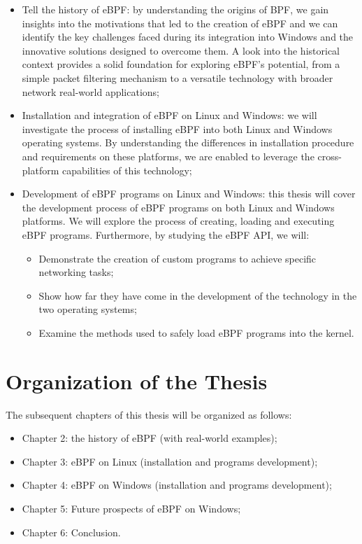\begin{itemize}
	\item Tell the history of eBPF: by understanding the origins of BPF, we gain insights into the 		
		motivations that led to the creation of eBPF and we can identify the key challenges faced during its integration into Windows and the innovative solutions designed to overcome them. 
		A look into the historical context provides a solid foundation for exploring eBPF's potential, from a simple packet filtering mechanism to a versatile technology with broader network real-world applications;
	\item Installation and integration of eBPF on Linux and Windows: we will investigate the process of
		installing eBPF into both Linux and Windows operating systems. 
		By understanding the differences in installation procedure and requirements on these platforms, we are enabled to leverage the cross-platform capabilities of this technology;
	\item Development of eBPF programs on Linux and Windows: this thesis will cover the development
		process of eBPF programs on both Linux and Windows platforms. 
		We will explore the process of creating, loading and executing eBPF programs.
		Furthermore, by studying the eBPF API, we will:
		\begin{itemize}
			\item Demonstrate the creation of custom programs to achieve specific networking tasks;
			\item Show how far they have come in the development of the technology in the two operating
				systems;
			\item Examine the methods used to safely load eBPF programs into the kernel. 
		\end{itemize}
\end{itemize}

\section{Organization of the Thesis}


The subsequent chapters of this thesis will be organized as follows:

\begin{itemize}
	\item Chapter 2: the history of eBPF (with real-world examples);
	\item Chapter 3: eBPF on Linux (installation and programs development);
	\item Chapter 4: eBPF on Windows (installation and programs development);
	\item Chapter 5: Future prospects of eBPF on Windows;
	\item Chapter 6: Conclusion.
\end{itemize}

